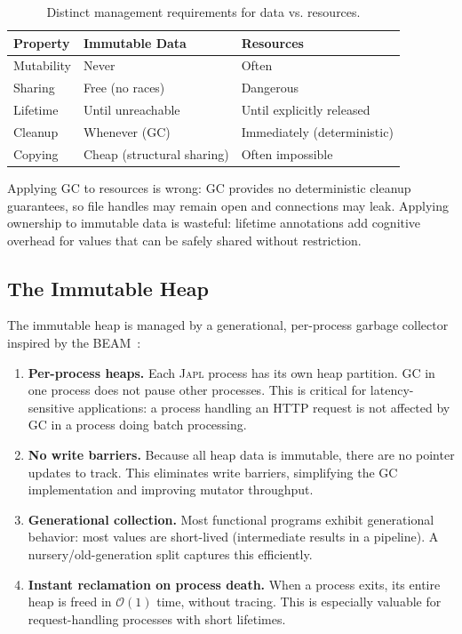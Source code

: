 \documentclass[11pt,twocolumn]{article}
\newcommand{\japl}{\textsc{Japl}}
\newcommand{\BigO}{\mathcal{O}}
\begin{document}
\begin{table}[H]
\centering
\scriptsize
\begin{tabularx}{\columnwidth}{lXX}
\toprule
\textbf{Property} & \textbf{Immutable Data} & \textbf{Resources} \\
\midrule
Mutability & Never & Often \\
Sharing & Free (no races) & Dangerous \\
Lifetime & Until unreachable & Until explicitly released \\
Cleanup & Whenever (GC) & Immediately (deterministic) \\
Copying & Cheap (structural sharing) & Often impossible \\
\bottomrule
\end{tabularx}
\caption{Distinct management requirements for data vs. resources.}
\label{tab:data-vs-resources}
\end{table}

Applying GC to resources is wrong: GC provides no deterministic cleanup guarantees, so file handles may remain open and connections may leak.
Applying ownership to immutable data is wasteful: lifetime annotations add cognitive overhead for values that can be safely shared without restriction.

\subsection{The Immutable Heap}

The immutable heap is managed by a generational, per-process garbage collector inspired by the BEAM~\citep{happi2023beam}:

\begin{enumerate}[leftmargin=*]
\item \textbf{Per-process heaps.} Each \japl{} process has its own heap partition. GC in one process does not pause other processes. This is critical for latency-sensitive applications: a process handling an HTTP request is not affected by GC in a process doing batch processing.

\item \textbf{No write barriers.} Because all heap data is immutable, there are no pointer updates to track. This eliminates write barriers, simplifying the GC implementation and improving mutator throughput.

\item \textbf{Generational collection.} Most functional programs exhibit generational behavior: most values are short-lived (intermediate results in a pipeline). A nursery/old-generation split captures this efficiently.

\item \textbf{Instant reclamation on process death.} When a process exits, its entire heap is freed in $\BigO(1)$ time, without tracing. This is especially valuable for request-handling processes with short lifetimes.
\end{enumerate}
\end{document}
